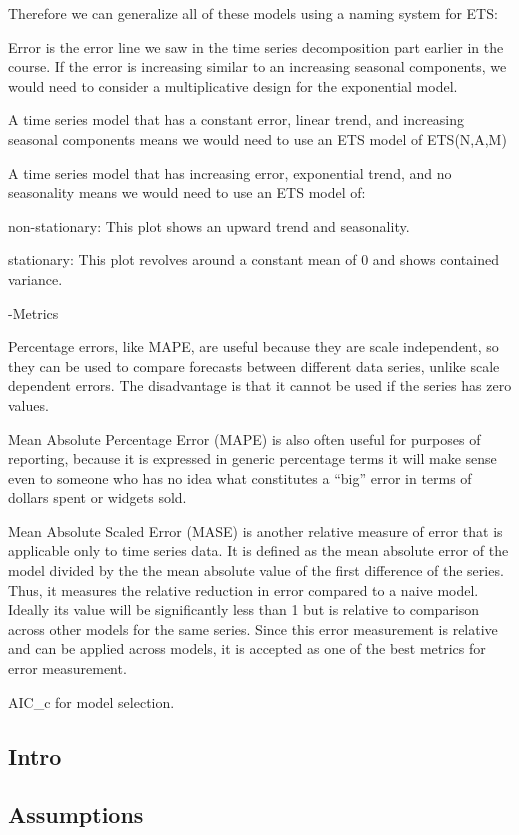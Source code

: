\documentclass[]{book}
\theoremstyle{definition}
\theoremstyle{definition}
\theoremstyle{definition}
\theoremstyle{remark}
\begin{document}
Therefore we can generalize all of these models using a naming system
for ETS:

Error is the error line we saw in the time series decomposition part
earlier in the course. If the error is increasing similar to an
increasing seasonal components, we would need to consider a
multiplicative design for the exponential model.

A time series model that has a constant error, linear trend, and
increasing seasonal components means we would need to use an ETS model
of ETS(N,A,M)

A time series model that has increasing error, exponential trend, and no
seasonality means we would need to use an ETS model of:

non-stationary: This plot shows an upward trend and seasonality.

stationary: This plot revolves around a constant mean of 0 and shows
contained variance.

-Metrics

Percentage errors, like MAPE, are useful because they are scale
independent, so they can be used to compare forecasts between different
data series, unlike scale dependent errors. The disadvantage is that it
cannot be used if the series has zero values.

Mean Absolute Percentage Error (MAPE) is also often useful for purposes
of reporting, because it is expressed in generic percentage terms it
will make sense even to someone who has no idea what constitutes a
``big'' error in terms of dollars spent or widgets sold.

Mean Absolute Scaled Error (MASE) is another relative measure of error
that is applicable only to time series data. It is defined as the mean
absolute error of the model divided by the the mean absolute value of
the first difference of the series. Thus, it measures the relative
reduction in error compared to a naive model. Ideally its value will be
significantly less than 1 but is relative to comparison across other
models for the same series. Since this error measurement is relative and
can be applied across models, it is accepted as one of the best metrics
for error measurement.

AIC\_c for model selection.

\subsection{Intro}\label{intro-18}

\subsection{Assumptions}\label{assumptions-18}
\end{document}
